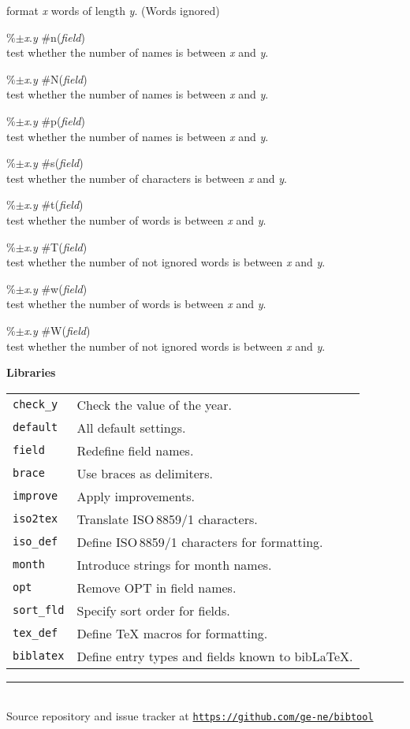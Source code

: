 \documentclass[a4paper]{article}
\newenvironment{FlatList}{\begin{list}{}{%
      \topsep=0pt\itemsep=0pt\parsep=0pt\let\makelabel=\flatlistlabel}}{\end{list}}%
\newcommand\flatlistlabel[1]{\descriptionlabel{\textsf{#1}}}
\newcommand\Section[1]{\begin{center}\normalsize\bfseries
    #1\end{center}\nobreak }
\newcommand\Lib[1]{\texttt{#1}}
\newcommand\link[1]{\href{#1}{\texttt{#1}}}
\begin{document}
\begin{multicols}{4}
\begin{FlatList}
    format {\it x}\/ words of length {\it y}. (Words ignored)
  \item [\%$\pm ${\it x}.{\it y}\/ \#n({\it field}\/)]\ \\
    test whether the  number of names is between {\it x}\/ and {\it y}.
  \item [\%$\pm ${\it x}.{\it y}\/ \#N({\it field}\/)]\ \\
    test whether the  number of names is between {\it x}\/ and {\it y}.
  \item [\%$\pm ${\it x}.{\it y}\/ \#p({\it field}\/)]\ \\
    test whether the  number of names is between {\it x}\/ and {\it y}.
  \item [\%$\pm ${\it x}.{\it y}\/ \#s({\it field}\/)]\ \\
    test whether the  number of characters is between {\it x}\/ and {\it y}.
  \item [\%$\pm ${\it x}.{\it y}\/ \#t({\it field}\/)]\ \\
    test whether the  number of words is between {\it x}\/ and {\it y}.
  \item [\%$\pm ${\it x}.{\it y}\/ \#T({\it field}\/)]\ \\
    test whether the  number of not ignored words is between {\it x}\/
    and {\it y}. 
  \item [\%$\pm ${\it x}.{\it y}\/ \#w({\it field}\/)]\ \\
    test whether the  number of words is between {\it x}\/ and {\it y}.
  \item [\%$\pm ${\it x}.{\it y}\/ \#W({\it field}\/)]\ \\
    test whether the  number of not ignored words is between {\it x}\/
    and {\it y}. 
  \end{FlatList} 

  \columnbreak
  \Section{Libraries}
  \begin{tabular}{lp{}}
  \Lib{check\_y}	& Check the value of the year.\\
  \Lib{default}		& All default settings.\\
  \Lib{field}		& Redefine field names.\\
  \Lib{brace}		& Use braces as delimiters.\\
  \Lib{improve}		& Apply improvements.\\
  \Lib{iso2tex}		& Translate ISO\,8859/1 characters.\\
  \Lib{iso\_def}	& Define ISO\,8859/1 characters for formatting.\\
  \Lib{month}		& Introduce strings for month names.\\
  \Lib{opt}		& Remove OPT in field names.\\
  \Lib{sort\_fld}	& Specify sort order for fields.\\
  \Lib{tex\_def}	& Define \TeX{} macros for formatting.\\
  \Lib{biblatex}	& Define entry types and fields known to bib\-\LaTeX.\\
  \end{tabular}
\end{multicols}
\vfill\vfill\vfill
\begin{center}\rule{.8\textwidth}{.1pt}\\
Source repository and issue tracker at \link{https://github.com/ge-ne/bibtool}
\end{center}
\end{document}
